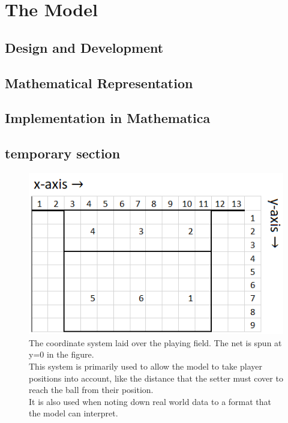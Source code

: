 \documentclass[main.tex]{subfiles}
\begin{document}
  \section{The Model}
    \subsection{Design and Development}
      \lipsum[4]
    \subsection{Mathematical Representation}
      \lipsum[5]
    \subsection{Implementation in Mathematica}
      \lipsum[6]
    \subsection{temporary section}
    
      \begin{figure}
        \centering
        \includegraphics[width=0.5\linewidth]{figures/playingFieldGridLabelled}
        \caption{The coordinate system laid over the playing field. The net is spun at y=0 in the figure. \\
          This system is primarily used to allow the model to take player positions into account, like the distance that the setter must cover to reach the ball from their position. \\
          It is also used when noting down real world data to a format that the model can interpret.}
        \label{fig:field}
      \end{figure}
      
\end{document}
